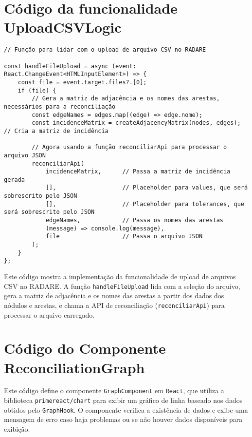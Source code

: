 \chapter{Código da funcionalidade UploadCSVLogic}
\label{Anexo:UploadCSVLogic}

\begin{verbatim}
// Função para lidar com o upload de arquivo CSV no RADARE

const handleFileUpload = async (event: React.ChangeEvent<HTMLInputElement>) => {
    const file = event.target.files?.[0];
    if (file) {
        // Gera a matriz de adjacência e os nomes das arestas, necessários para a reconciliação
        const edgeNames = edges.map((edge) => edge.nome);
        const incidenceMatrix = createAdjacencyMatrix(nodes, edges); // Cria a matriz de incidência
  
        // Agora usando a função reconciliarApi para processar o arquivo JSON
        reconciliarApi(
            incidenceMatrix,      // Passa a matriz de incidência gerada
            [],                   // Placeholder para values, que será sobrescrito pelo JSON
            [],                   // Placeholder para tolerances, que será sobrescrito pelo JSON
            edgeNames,            // Passa os nomes das arestas
            (message) => console.log(message),
            file                  // Passa o arquivo JSON
        );
    }
};
\end{verbatim}

Este código mostra a implementação da funcionalidade de upload de arquivos CSV no RADARE. A função \texttt{handleFileUpload} lida com a seleção do arquivo, gera a matriz de adjacência e os nomes das arestas a partir dos dados dos nódulos e arestas, e chama a API de reconciliação (\texttt{reconciliarApi}) para processar o arquivo carregado.
\chapter{Código do Componente ReconciliationGraph}
\label{Anexo:ReconciliationGraph}


Este código define o componente \texttt{GraphComponent} em \texttt{React}, que utiliza a biblioteca \texttt{primereact/chart} para exibir um gráfico de linha baseado nos dados obtidos pelo \texttt{GraphHook}. O componente verifica a existência de dados e exibe uma mensagem de erro caso haja problemas ou se não houver dados disponíveis para exibição.

